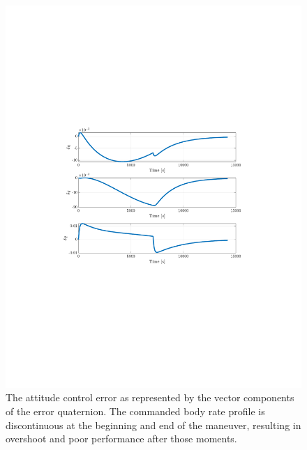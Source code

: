 \documentclass[]{article}
\begin{document}
\begin{figure}[!h]
	\centering
	\includegraphics[width=\linewidth,trim={4cm, 8cm, 4cm, 8cm},clip]{figs/P3Q1.pdf}
	\caption{The attitude control error as represented by the vector components of the error quaternion. The commanded body rate profile is discontinuous at the beginning and end of the maneuver, resulting in overshoot and poor performance after those moments.}
	\label{fig:P3Q1}
\end{figure}
\end{document}
